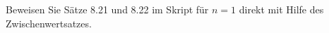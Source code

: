                 \begin{prob}
Beweisen Sie S\"atze 8.21 und 8.22 im Skript f\"ur $n=1$ direkt mit Hilfe des Zwischenwertsatzes. 


\end{prob}
